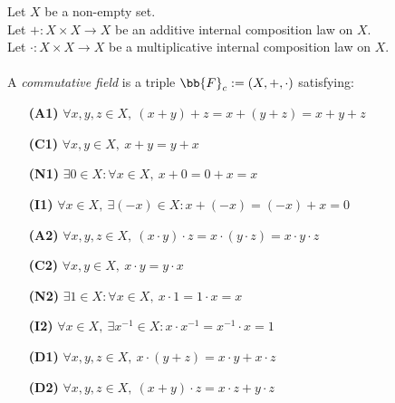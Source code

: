 \begin{definition-pre}
    \label{def:commutative_field}
    Let $X$ be a non-empty set. \\
    Let $+: X\times X \to X$ be an additive internal composition law on $X$. \\
    Let $\cdot: X\times X \to X$ be a multiplicative internal composition law on $X$. \\\\
    A \textit{commutative field} is a triple $\bb{F}_c:= (X, +, \cdot)$ satisfying:
    \begin{enumerate}
        \item [\textbf{(A1)}] $\forall x,y,z\in X,\ (x+y)+z= x+(y+z) = x+y+z$
        \item [\textbf{(C1)}] $\forall x,y\in X,\ x+y = y+x$
        \item [\textbf{(N1)}] $\exists 0 \in X : \forall x \in X,\ x+0 = 0+x = x$
        \item [\textbf{(I1)}] $\forall x \in X,\ \exists (-x)\in X: x+(-x) = (-x)+x = 0$
        \item [\textbf{(A2)}] $\forall x,y,z\in X,\ (x\cdot y)\cdot z= x\cdot(y\cdot z) = x\cdot y\cdot z$
        \item [\textbf{(C2)}] $\forall x,y\in X,\ x\cdot y = y\cdot x$
        \item [\textbf{(N2)}] $\exists 1 \in X : \forall x \in X,\ x\cdot1 = 1\cdot x = x$
        \item [\textbf{(I2)}] $\forall x \in X,\ \exists x^{-1}\in X: x\cdot x^{-1} = x^{-1}\cdot x = 1$
        \item [\textbf{(D1)}] $\forall x,y,z \in X,\ x\cdot(y+z)=x\cdot y+x\cdot z$
        \item [\textbf{(D2)}] $\forall x,y,z \in X,\ (x+y)\cdot z=x\cdot z+y\cdot z$
    \end{enumerate}
\end{definition-pre}

